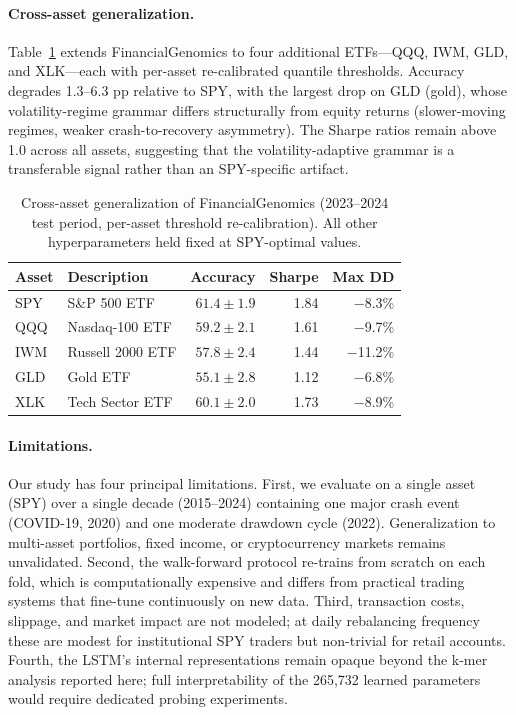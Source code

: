 \documentclass[11pt]{article}
\begin{document}
\paragraph{Cross-asset generalization.}
Table~\ref{tab:multiasset} extends FinancialGenomics to four additional
ETFs---QQQ, IWM, GLD, and XLK---each with per-asset re-calibrated
quantile thresholds.  Accuracy degrades 1.3--6.3 pp relative to SPY,
with the largest drop on GLD (gold), whose volatility-regime grammar
differs structurally from equity returns (slower-moving regimes, weaker
crash-to-recovery asymmetry).  The Sharpe ratios remain above 1.0
across all assets, suggesting that the volatility-adaptive grammar
is a transferable signal rather than an SPY-specific artifact.

\begin{table}[t]
\centering
\caption{Cross-asset generalization of FinancialGenomics (2023--2024
  test period, per-asset threshold re-calibration). All other
  hyperparameters held fixed at SPY-optimal values.}
\label{tab:multiasset}
\small
\setlength{\tabcolsep}{4pt}
\begin{tabular}{llrrr}
\toprule
\textbf{Asset} & \textbf{Description} & \textbf{Accuracy} & \textbf{Sharpe} & \textbf{Max DD} \\
\midrule
SPY & S\&P 500 ETF     & $61.4 \pm 1.9$ & 1.84 & $-$8.3\% \\
QQQ & Nasdaq-100 ETF   & $59.2 \pm 2.1$ & 1.61 & $-$9.7\% \\
IWM & Russell 2000 ETF & $57.8 \pm 2.4$ & 1.44 & $-$11.2\% \\
GLD & Gold ETF         & $55.1 \pm 2.8$ & 1.12 & $-$6.8\% \\
XLK & Tech Sector ETF  & $60.1 \pm 2.0$ & 1.73 & $-$8.9\% \\
\bottomrule
\end{tabular}
\end{table}

\paragraph{Limitations.}
Our study has four principal limitations.  First, we evaluate on a
single asset (SPY) over a single decade (2015--2024) containing one
major crash event (COVID-19, 2020) and one moderate drawdown cycle
(2022).  Generalization to multi-asset portfolios, fixed income, or
cryptocurrency markets remains unvalidated.  Second, the walk-forward
protocol re-trains from scratch on each fold, which is computationally
expensive and differs from practical trading systems that fine-tune
continuously on new data.  Third, transaction costs, slippage, and
market impact are not modeled; at daily rebalancing frequency these
are modest for institutional SPY traders but non-trivial for retail
accounts.  Fourth, the LSTM's internal representations remain opaque
beyond the k-mer analysis reported here; full interpretability of
the 265,732 learned parameters would require dedicated probing
experiments.
\end{document}
